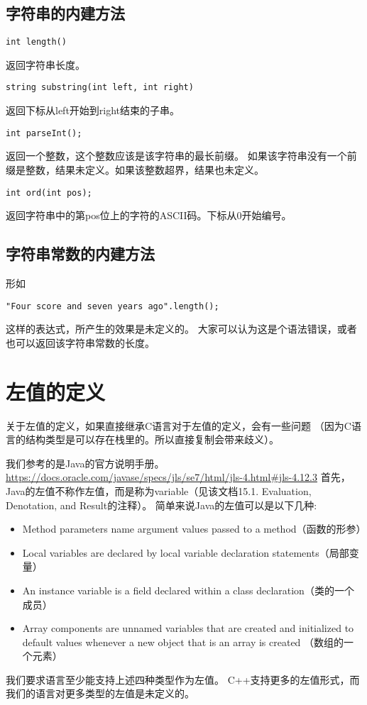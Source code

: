 \documentclass[twocolumn]{article}
\begin{document}
\subsection{字符串的内建方法}
\begin{verbatim}
int length()
\end{verbatim}
返回字符串长度。
\begin{verbatim}
string substring(int left, int right)
\end{verbatim}
返回下标从left开始到right结束的子串。
\begin{verbatim}
int parseInt();
\end{verbatim}
返回一个整数，这个整数应该是该字符串的最长前缀。
如果该字符串没有一个前缀是整数，结果未定义。如果该整数超界，结果也未定义。
\begin{verbatim}
int ord(int pos);
\end{verbatim}
返回字符串中的第pos位上的字符的ASCII码。下标从0开始编号。

\subsection{字符串常数的内建方法}
形如
\begin{verbatim}
"Four score and seven years ago".length();
\end{verbatim}
这样的表达式，所产生的效果是未定义的。
大家可以认为这是个语法错误，或者也可以返回该字符串常数的长度。



\section{左值的定义}

关于左值的定义，如果直接继承C语言对于左值的定义，会有一些问题
（因为C语言的结构类型是可以存在栈里的。所以直接复制会带来歧义）。

我们参考的是Java的官方说明手册。
\url{https://docs.oracle.com/javase/specs/jls/se7/html/jls-4.html#jls-4.12.3}
首先，Java的左值不称作左值，而是称为variable（见该文档15.1. Evaluation, Denotation, and Result的注释）。
简单来说Java的左值可以是以下几种:
\begin{itemize}
\item Method parameters name argument values passed to a method（函数的形参）
\item Local variables are declared by local variable declaration statements（局部变量）
\item An instance variable is a field declared within a class declaration（类的一个成员）
\item Array components are unnamed variables that are created and initialized to default values whenever a new object that is an array is created
（数组的一个元素）
\end{itemize}
我们要求语言至少能支持上述四种类型作为左值。
C++支持更多的左值形式，而我们的语言对更多类型的左值是未定义的。
\end{document}
